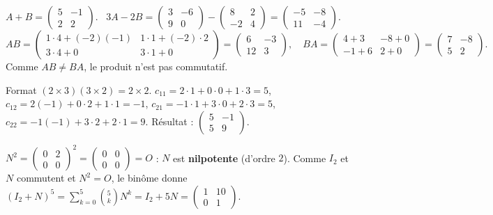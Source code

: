 $A+B=\begin{pmatrix}5&-1\\2&2\end{pmatrix}$. \
$3A-2B=\begin{pmatrix}3&-6\\9&0\end{pmatrix}-\begin{pmatrix}8&2\\-2&4\end{pmatrix}
=\begin{pmatrix}-5&-8\\11&-4\end{pmatrix}$. \
\[
AB=\begin{pmatrix}1\cdot4+(-2)(-1)&1\cdot1+(-2)\cdot2\\ 3\cdot4+0&3\cdot1+0\end{pmatrix}
=\begin{pmatrix}6&-3\\12&3\end{pmatrix},\quad
BA=\begin{pmatrix}4+3&-8+0\\-1+6&2+0\end{pmatrix}=\begin{pmatrix}7&-8\\5&2\end{pmatrix}.
\]
Comme $AB\neq BA$, le produit n'est pas commutatif.

Format $(2\times3)(3\times2)=2\times2$.
$c_{11}=2\cdot1+0\cdot0+1\cdot3=5$, $c_{12}=2(-1)+0\cdot2+1\cdot1=-1$,
$c_{21}=-1\cdot1+3\cdot0+2\cdot3=5$, $c_{22}=-1(-1)+3\cdot2+2\cdot1=9$. Résultat :
$\begin{pmatrix}5&-1\\5&9\end{pmatrix}$.

$N^2=\begin{pmatrix}0&2\\0&0\end{pmatrix}^2=\begin{pmatrix}0&0\\0&0\end{pmatrix}=O$ : $N$ est
\textbf{nilpotente} (d'ordre $2$). Comme $I_2$ et $N$ commutent et $N^2=O$, le binôme donne
$(I_2+N)^5=\sum_{k=0}^{5}\binom5k N^k=I_2+5N=\begin{pmatrix}1&10\\0&1\end{pmatrix}$.

